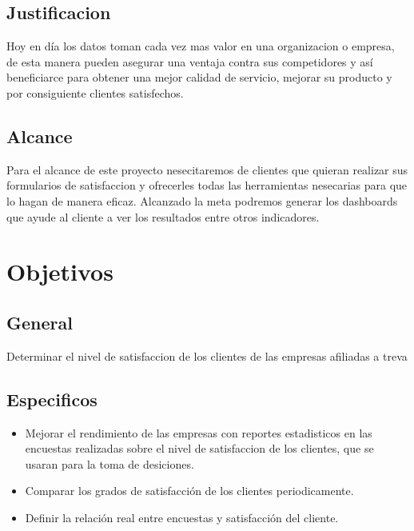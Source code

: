 \documentclass[twoside,twocolumn]{article}
\begin{document}
\subsection{Justificacion}
Hoy en día los datos toman cada vez mas valor en una organizacion o empresa, de esta manera pueden asegurar una ventaja contra sus competidores y así beneficiarce para obtener una mejor calidad de servicio, mejorar su producto y por consiguiente clientes satisfechos.

\subsection{Alcance}
Para el alcance de este proyecto nesecitaremos de clientes que quieran realizar sus formularios de satisfaccion y ofrecerles todas las herramientas nesecarias para que lo hagan de manera eficaz. Alcanzado la meta podremos generar los dashboards que ayude al cliente a ver los resultados entre otros indicadores.


\section{Objetivos}
\subsection{General}
Determinar el nivel de satisfaccion de los clientes de las empresas afiliadas a treva

\subsection{Especificos}
\begin{itemize}
\item Mejorar el rendimiento de las empresas con reportes estadisticos en las encuestas realizadas sobre el nivel de satisfaccion de los clientes, que se usaran para la toma de desiciones.
\item Comparar los grados de satisfacción de los clientes periodicamente.
\item Definir la relación real entre encuestas y satisfacción del cliente.
\end{itemize}
\end{document}
